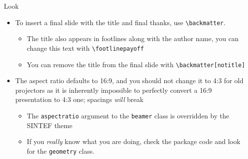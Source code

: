 \begin{frame}[fragile]{Look}
	\begin{itemize}
		\item To insert a final slide with the title and final thanks, use \verb|\backmatter|.
		      \begin{itemize}
			      \item The title also appears in footlines along with the author name, you can change this text with \verb|\footlinepayoff|
			      \item You can remove the title from the final slide with \verb|\backmatter[notitle]|
		      \end{itemize}
		\item The aspect ratio defaults to 16:9, and you should not change it to 4:3
		      for old projectors as it is inherently impossible to perfectly convert a
		      16:9 presentation to 4:3 one; spacings \emph{will} break
		      \begin{itemize}
			      \item The \texttt{aspectratio} argument to the \texttt{beamer} class is
			            overridden by the SINTEF theme
			      \item If you \emph{really} know what you are doing, check the package
			            code and look for the \texttt{geometry} class.
		      \end{itemize}
	\end{itemize}
\end{frame}